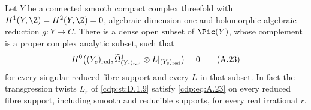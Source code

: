 
\begin{proposition}\label{cdp:st:A.4.9}
Let $Y$ be a connected smooth compact complex threefold with $H^1(Y,\Z)=H^2(Y,\Z)=0$, algebraic dimension one and holomorphic algebraic reduction $g:Y\to C$. There is a dense open subset of $\Pic(Y)$, whose complement is a proper complex analytic subset, such that
\[
 H^0\bigl((Y_c)_{\rm red},
       \widetilde\Omega^1_{(Y_c)_{\rm red}}\otimes L|_{(Y_c)_{\rm red}}\bigr)=0
 \tag{A.23}\label{cdp:eq:A.23}
\]
for every singular reduced fibre support and every $L$ in that subset. In fact the transgression twists $L_r$ of \ref{cdp:st:D.1.9} satisfy \eqref{cdp:eq:A.23} on every reduced fibre support, including smooth and reducible supports, for every real irrational $r$.
\end{proposition}
